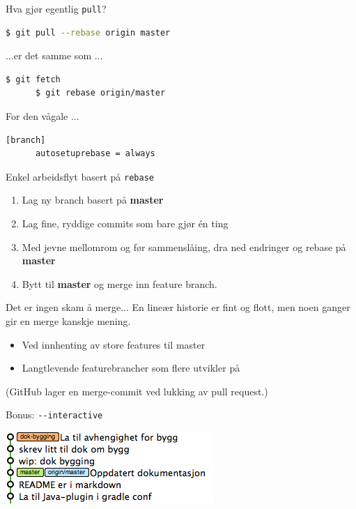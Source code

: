 \documentclass{beamer}
\begin{document}
\begin{frame}[fragile]{Hva gjør egentlig \texttt{pull}?}
    \begin{lstlisting}[language=bash]
      $ git pull --rebase origin master
    \end{lstlisting}
    \medskip
    ...er det samme som ...
    \medskip
    \begin{lstlisting}[language=bash]
      $ git fetch
      $ git rebase origin/master
    \end{lstlisting}
\end{frame}

\begin{frame}[fragile]{For den vågale ...}
    \begin{lstlisting}[language=bash, caption=\textasciitilde/.gitconfig]
    [branch]  
      autosetuprebase = always
    \end{lstlisting}
\end{frame}

\begin{frame}{Enkel arbeidsflyt basert på \texttt{rebase}}
    \begin{enumerate}
        \item<+-> Lag ny branch basert på \textbf{master}
        \item<+-> Lag fine, ryddige commits som bare gjør én ting
        \item<+-> Med jevne mellomrom og før sammenslåing, dra ned endringer og rebase på \textbf{master}
        \item<+-> Bytt til \textbf{master} og merge inn feature branch.
    \end{enumerate}
\end{frame}

\begin{frame}{Det er ingen skam å merge...}
    En lineær historie er fint og flott, men noen ganger gir en merge kanskje mening.\\
    \pause
    \medskip
    \begin{itemize}
        \item Ved innhenting av store features til master
        \item Langtlevende featurebrancher som flere utvikler på
    \end{itemize}
    \pause
    (GitHub lager en merge-commit ved lukking av pull request.)
\end{frame}

\begin{frame}{Bonus: \texttt{-{}-interactive}}
    \begin{center}
        \includegraphics[scale=0.7]{6.png}
    \end{center}
\end{frame}
\end{document}
